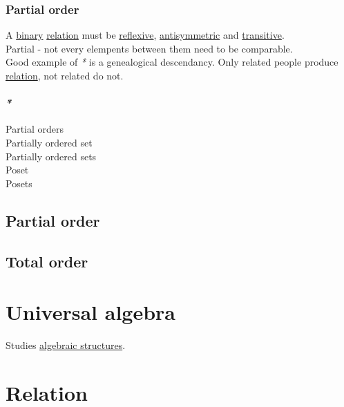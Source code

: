 \documentclass[a4paper,14pt,oneside]{book}
\begin{document}
\subsection{\label{org9409e5f}Partial order}
\label{sec:org715cf5c}

A \hyperref[orga442c45]{binary} \hyperref[org6396c35]{relation} must be \hyperref[org65baa48]{reflexive}, \hyperref[org68e0dbc]{antisymmetric} and \hyperref[orga52134c]{transitive}.\\

Partial - not every elempents between them need to be comparable.\\

Good example of \emph{*} is a genealogical descendancy. Only related people produce \hyperref[org6396c35]{relation}, not related do not.\\

\subsubsection{\emph{*}}
\label{sec:org6e151b1}

\label{orgb9d2acd}Partial orders\\
\label{org576a4f6}Partially ordered set\\
\label{orgc576689}Partially ordered sets\\
\label{orgd8b0351}Poset\\
\label{org8e116b4}Posets\\

\section{\label{org3eca552}Partial order}
\label{sec:org07b9cab}

\section{\label{orgf334903}Total order}
\label{sec:orgd5176d7}

\chapter{\label{org6fe3604}Universal algebra}
\label{sec:org4be33bd}

Studies \hyperref[org011ad83]{algebraic structures}.\\

\chapter{\label{org7219d3c}Relation}
\label{sec:org4279658}
\end{document}
